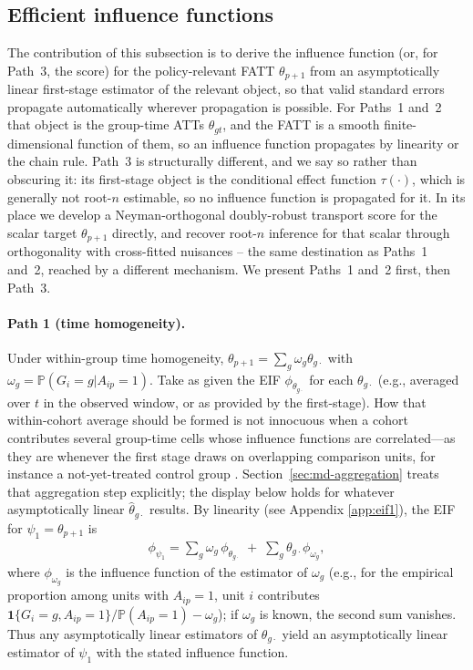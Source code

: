 \documentclass{article}
\renewcommand{\P}{\mathbb{P}}
\begin{document}
\subsection{Efficient influence functions}\label{sec:eif-derivation}

The contribution of this subsection is to derive the influence function (or, for Path~3, the score) for the policy-relevant FATT $\theta_{p+1}$ from an asymptotically linear first-stage estimator of the relevant object, so that valid standard errors propagate automatically wherever propagation is possible. For Paths~1 and~2 that object is the group-time ATTs $\theta_{gt}$, and the FATT is a smooth finite-dimensional function of them, so an influence function propagates by linearity or the chain rule. Path~3 is structurally different, and we say so rather than obscuring it: its first-stage object is the conditional effect function $\tau(\cdot)$, which is generally not root-$n$ estimable, so no influence function is propagated for it. In its place we develop a Neyman-orthogonal doubly-robust transport score for the scalar target $\theta_{p+1}$ directly, and recover root-$n$ inference for that scalar through orthogonality with cross-fitted nuisances -- the same destination as Paths~1 and~2, reached by a different mechanism. We present Paths~1 and~2 first, then Path~3.

\paragraph{Path 1 (time homogeneity).} Under within-group time homogeneity, $\theta_{p+1} = \sum_g \omega_g \theta_{g\cdot}$ with $\omega_g = \P(G_i = g | A_{ip} = 1)$. Take as given the EIF $\phi_{\theta_{g\cdot}}$ for each $\theta_{g\cdot}$ (e.g., averaged over $t$ in the observed window, or as provided by the first-stage). How that within-cohort average should be formed is not innocuous when a cohort contributes several group-time cells whose influence functions are correlated---as they are whenever the first stage draws on overlapping comparison units, for instance a not-yet-treated control group \citep{callawayDifferenceindifferencesMultipleTime2021}. Section~\ref{sec:md-aggregation} treats that aggregation step explicitly; the display below holds for whatever asymptotically linear $\widehat{\theta}_{g\cdot}$ results. By linearity (see Appendix \ref{app:eif1}), the EIF for $\psi_1 = \theta_{p+1}$ is
\begin{align*}
    \phi_{\psi_1} = \sum_g \omega_g \, \phi_{\theta_{g\cdot}} \; + \; \sum_g \theta_{g\cdot} \phi_{\omega_g},
\end{align*}
where $\phi_{\omega_g}$ is the influence function of the estimator of $\omega_g$ (e.g., for the empirical proportion among units with $A_{ip}=1$, unit $i$ contributes $\mathbf{1}\{G_i=g, A_{ip}=1\}/\P(A_{ip}=1) - \omega_g$); if $\omega_g$ is known, the second sum vanishes. Thus any asymptotically linear estimators of $\theta_{g\cdot}$ yield an asymptotically linear estimator of $\psi_1$ with the stated influence function.
\end{document}
